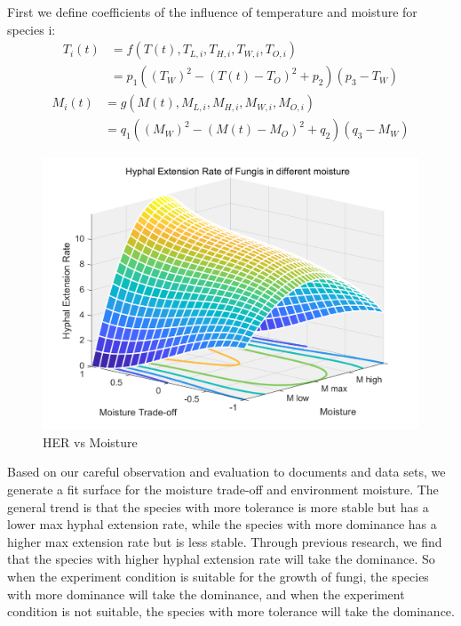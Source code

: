 \documentclass[12pt]{article}
\begin{document}
First we define coefficients of the influence of temperature and moisture for species i:
\begin{equation}
	\begin{aligned}
	T_{i}(t)&=f(T(t), T_{L,i}, T_{H,i}, T_{W,i}, T_{O,i})\\
	&=p_{1}((T_{W})^2-(T(t)-T_{O})^2+p_{2})(p_{3}-T_{W})
	\end{aligned}
\end{equation}
\begin{equation}
	\begin{aligned}
	M_{i}(t)&=g(M(t), M_{L,i}, M_{H,i}, M_{W,i}, M_{O,i})\\
	&=q_{1}((M_{W})^2-(M(t)-M_{O})^2+q_{2})(q_{3}-M_{W})
	\end{aligned}
\end{equation}

\begin{figure}[H]
	\small
	\centering
	\includegraphics[width=15cm]{./pictures/env.png}
	\caption{HER vs Moisture}\label{jj}
\end{figure}
Based on our careful observation and evaluation to documents and data sets, we generate a fit surface for the moisture trade-off and environment moisture. The general trend is that the species with more tolerance is more stable but has a lower max hyphal extension rate, while the species with more dominance has a higher max extension rate but is less stable. Through previous research, we find that the species with higher hyphal extension rate will take the dominance. So when the experiment condition is suitable for the growth of fungi, the species with more dominance will take the dominance, and when the experiment condition is not suitable, the species with more tolerance will take the dominance.
\end{document}
